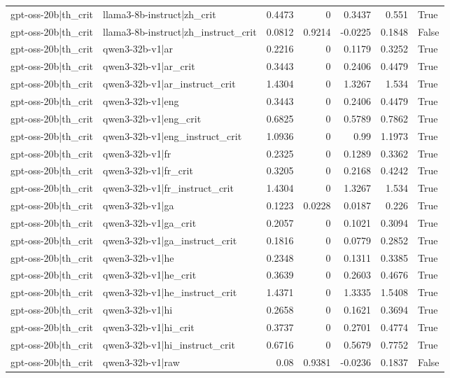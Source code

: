 \begin{table}
\begin{tabular}{l l r r r r l}
gpt-oss-20b|th_crit & llama3-8b-instruct|zh_crit & 0.4473 & 0 & 0.3437 & 0.551 & True \\
gpt-oss-20b|th_crit & llama3-8b-instruct|zh_instruct_crit & 0.0812 & 0.9214 & -0.0225 & 0.1848 & False \\
gpt-oss-20b|th_crit & qwen3-32b-v1|ar & 0.2216 & 0 & 0.1179 & 0.3252 & True \\
gpt-oss-20b|th_crit & qwen3-32b-v1|ar_crit & 0.3443 & 0 & 0.2406 & 0.4479 & True \\
gpt-oss-20b|th_crit & qwen3-32b-v1|ar_instruct_crit & 1.4304 & 0 & 1.3267 & 1.534 & True \\
gpt-oss-20b|th_crit & qwen3-32b-v1|eng & 0.3443 & 0 & 0.2406 & 0.4479 & True \\
gpt-oss-20b|th_crit & qwen3-32b-v1|eng_crit & 0.6825 & 0 & 0.5789 & 0.7862 & True \\
gpt-oss-20b|th_crit & qwen3-32b-v1|eng_instruct_crit & 1.0936 & 0 & 0.99 & 1.1973 & True \\
gpt-oss-20b|th_crit & qwen3-32b-v1|fr & 0.2325 & 0 & 0.1289 & 0.3362 & True \\
gpt-oss-20b|th_crit & qwen3-32b-v1|fr_crit & 0.3205 & 0 & 0.2168 & 0.4242 & True \\
gpt-oss-20b|th_crit & qwen3-32b-v1|fr_instruct_crit & 1.4304 & 0 & 1.3267 & 1.534 & True \\
gpt-oss-20b|th_crit & qwen3-32b-v1|ga & 0.1223 & 0.0228 & 0.0187 & 0.226 & True \\
gpt-oss-20b|th_crit & qwen3-32b-v1|ga_crit & 0.2057 & 0 & 0.1021 & 0.3094 & True \\
gpt-oss-20b|th_crit & qwen3-32b-v1|ga_instruct_crit & 0.1816 & 0 & 0.0779 & 0.2852 & True \\
gpt-oss-20b|th_crit & qwen3-32b-v1|he & 0.2348 & 0 & 0.1311 & 0.3385 & True \\
gpt-oss-20b|th_crit & qwen3-32b-v1|he_crit & 0.3639 & 0 & 0.2603 & 0.4676 & True \\
gpt-oss-20b|th_crit & qwen3-32b-v1|he_instruct_crit & 1.4371 & 0 & 1.3335 & 1.5408 & True \\
gpt-oss-20b|th_crit & qwen3-32b-v1|hi & 0.2658 & 0 & 0.1621 & 0.3694 & True \\
gpt-oss-20b|th_crit & qwen3-32b-v1|hi_crit & 0.3737 & 0 & 0.2701 & 0.4774 & True \\
gpt-oss-20b|th_crit & qwen3-32b-v1|hi_instruct_crit & 0.6716 & 0 & 0.5679 & 0.7752 & True \\
gpt-oss-20b|th_crit & qwen3-32b-v1|raw & 0.08 & 0.9381 & -0.0236 & 0.1837 & False \\

\end{tabular}
\end{table}
